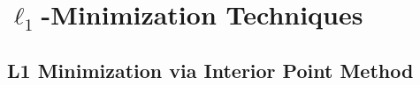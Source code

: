 \chapter{$\ell_1$-Minimization Techniques}
\label{chap:minimization}

\section{L1 Minimization via Interior Point Method} %

%
%

%
%
